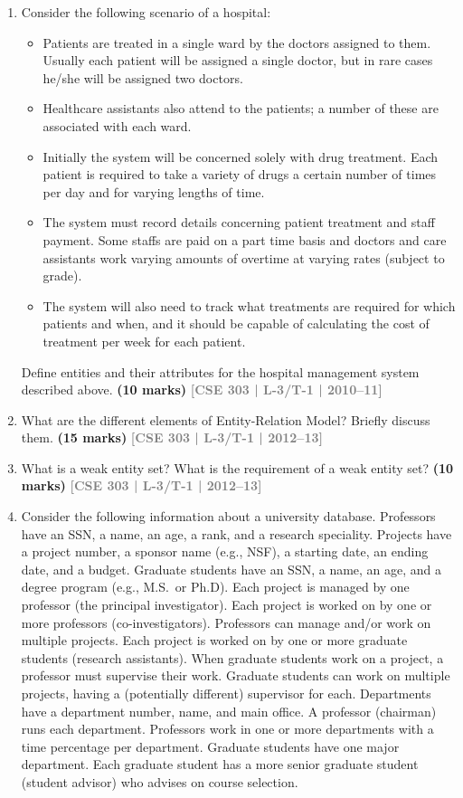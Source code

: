\documentclass[12pt,a3paper]{article}
\newcommand{\yr}[1]{\hfill\textcolor{gray}{\small\textbf{[#1]}}}
\newcommand{\mk}[1]{\textcolor{orange!70!black}{\small\textbf{(#1 marks)}}}
\begin{document}
\begin{enumerate}

\item Consider the following scenario of a hospital:

\begin{itemize}[leftmargin=1.5em,itemsep=2pt]
  \item Patients are treated in a single ward by the doctors assigned to them. Usually each patient will be assigned a single doctor, but in rare cases he/she will be assigned two doctors.
  \item Healthcare assistants also attend to the patients; a number of these are associated with each ward.
  \item Initially the system will be concerned solely with drug treatment. Each patient is required to take a variety of drugs a certain number of times per day and for varying lengths of time.
  \item The system must record details concerning patient treatment and staff payment. Some staffs are paid on a part time basis and doctors and care assistants work varying amounts of overtime at varying rates (subject to grade).
  \item The system will also need to track what treatments are required for which patients and when, and it should be capable of calculating the cost of treatment per week for each patient.
\end{itemize}

Define entities and their attributes for the hospital management system described above.
\mk{10} \yr{CSE 303 | L-3/T-1 | 2010--11}

\item What are the different elements of Entity-Relation Model? Briefly discuss them.
\mk{15} \yr{CSE 303 | L-3/T-1 | 2012--13}

\item What is a weak entity set? What is the requirement of a weak entity set?
\mk{10} \yr{CSE 303 | L-3/T-1 | 2012--13}

\item Consider the following information about a university database. Professors have an SSN, a name, an age, a rank, and a research speciality. Projects have a project number, a sponsor name (e.g., NSF), a starting date, an ending date, and a budget. Graduate students have an SSN, a name, an age, and a degree program (e.g., M.S.\ or Ph.D). Each project is managed by one professor (the principal investigator). Each project is worked on by one or more professors (co-investigators). Professors can manage and/or work on multiple projects. Each project is worked on by one or more graduate students (research assistants). When graduate students work on a project, a professor must supervise their work. Graduate students can work on multiple projects, having a (potentially different) supervisor for each. Departments have a department number, name, and main office. A professor (chairman) runs each department. Professors work in one or more departments with a time percentage per department. Graduate students have one major department. Each graduate student has a more senior graduate student (student advisor) who advises on course selection.


\end{enumerate}
\end{document}

